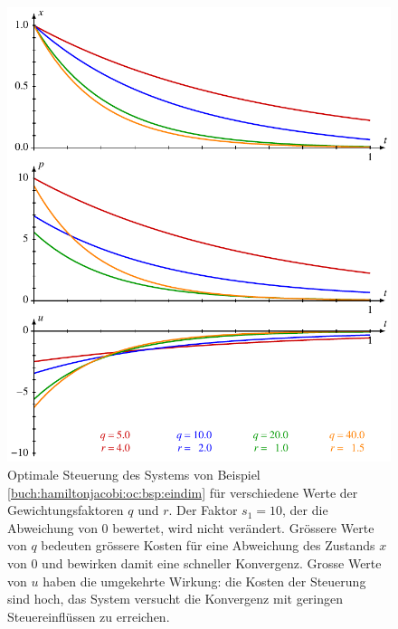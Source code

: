 %
%
%
\begin{figure}
\centering
\includegraphics{chapters/080-hamiltonjacobi/examples/eindim.pdf}
\caption{Optimale Steuerung des Systems von Beispiel
\ref{buch:hamiltonjacobi:oc:bsp:eindim} für verschiedene Werte
der Gewichtungsfaktoren $q$ und $r$.
Der Faktor $s_1=10$, der die Abweichung von $0$ bewertet, wird nicht
verändert.
Grössere Werte von $q$ bedeuten grössere Kosten für eine Abweichung
des Zustands $x$ von $0$ und bewirken damit eine schneller Konvergenz.
Grosse Werte von $u$ haben die umgekehrte Wirkung: die Kosten der
Steuerung sind hoch, das System versucht die Konvergenz mit geringen
Steuereinflüssen zu erreichen.
\label{buch:hamiltonjacobi:fig:eindim}}
\end{figure}
